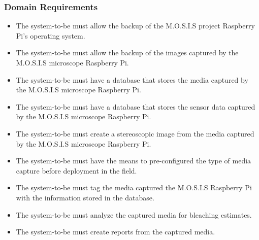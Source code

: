 \documentclass[12pt]{article}
\begin{document}
\subsubsection{Domain Requirements}
\begin{itemize}
	\item The system-to-be must allow the backup of the M.O.S.I.S project Raspberry Pi's operating system.
	\item The system-to-be must allow the backup of the images captured by the M.O.S.I.S microscope Raspberry Pi.
	\item The system-to-be must have a database that stores the media captured by the M.O.S.I.S microscope Raspberry Pi.
	\item The system-to-be must have a database that stores the sensor data captured by the M.O.S.I.S microscope Raspberry Pi.
	\item The system-to-be must create a stereoscopic image from the media captured by the M.O.S.I.S microscope Raspberry Pi.
	\item The system-to-be must have the means to pre-configured the type of media capture before deployment in the field.
	\item The system-to-be must tag the media captured the M.O.S.I.S Raspberry Pi with the information stored in the database.
	\item The system-to-be must analyze the captured media for bleaching estimates.
	\item The system-to-be must create reports from the captured media.
\end{itemize}
\end{document}

